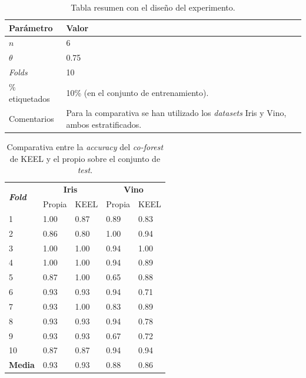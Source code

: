 \begin{table}
	\begin{centering}
		\begin{tabular}{@{}p{10em} p{20em} @{}}
			\toprule
			\textbf{Parámetro} & \textbf{Valor} \\ 
			\midrule
			$n$ & 6\\
			$\theta$ & 0.75 \\
			\textit{Folds} & 10 \\
			\% etiquetados & 10\% (en el conjunto de entrenamiento). \\
			Comentarios & Para la comparativa se han utilizado los \textit{datasets} Iris y Vino, ambos estratificados.\\
			\bottomrule
			
		\end{tabular}
	\end{centering}
	\caption[\textit{Co-forest}: resumen del experimento]{Tabla resumen con el diseño del experimento.}
	\label{tabla_coforest_keelvsnuestro_diseño}	
\end{table}

\begin{table}
	\begin{centering}
		
		\begin{tabular}{@{} p{4em} p{5em} p{7em} p{7em} p{7em} @{}}
			\toprule
			\multirow{2}{*}{\textbf{\textit{ \hfil Fold}}} & \multicolumn{2}{c}{\hfil \textbf{Iris}}& \multicolumn{2}{c}{\hfil \textbf{Vino}} \\
			\cmidrule{2-3} \cmidrule{4-5}
			& \hfil Propia & \hfil KEEL & \hfil Propia & \hfil KEEL\\ 
			\toprule
			\hfil 1 &\hfil 1.00	&\hfil 0.87	& \hfil 0.89  & \hfil0.83 \\
			\hfil 2 &\hfil 0.86	&\hfil 0.80	& \hfil 1.00 	&  \hfil 0.94 \\
			\hfil 3 & \hfil 1.00	& \hfil 1.00	& \hfil 0.94	& \hfil 1.00 \\
			\hfil 4 & \hfil 1.00	& \hfil 1.00	& \hfil 0.94	& \hfil 0.89 \\
			\hfil 5 & \hfil 0.87	& \hfil 1.00	& \hfil 0.65	& \hfil 0.88 \\
			\hfil 6 & \hfil 0.93	& \hfil 0.93	& \hfil 0.94	& \hfil 0.71 \\
			\hfil 7 & \hfil 0.93	& \hfil 1.00	& \hfil 0.83	& \hfil 0.89 \\
			\hfil 8 & \hfil 0.93	& \hfil 0.93	& \hfil 0.94	& \hfil 0.78 \\
			\hfil 	9 & \hfil 0.93	& \hfil 0.93	& \hfil 0.67	& \hfil 0.72 \\
			\hfil 10& \hfil 0.87	& \hfil 0.87	& \hfil 0.94	& \hfil 0.94 \\
			\midrule
			\hfil \textbf{Media} 			& \hfil 0.93	& \hfil 0.93	& \hfil 0.88	& \hfil 0.86 \\
			\bottomrule
		\end{tabular}
	\end{centering}
	\caption[\textit{Co-forest}: comparativa entre KEEL y la implementación propia]{Comparativa entre la \textit{accuracy} del \textit{co-forest} de KEEL y el propio sobre el conjunto de \textit{test}.}
	\label{tabla_coforest_keelvsnuestro}	
\end{table}

